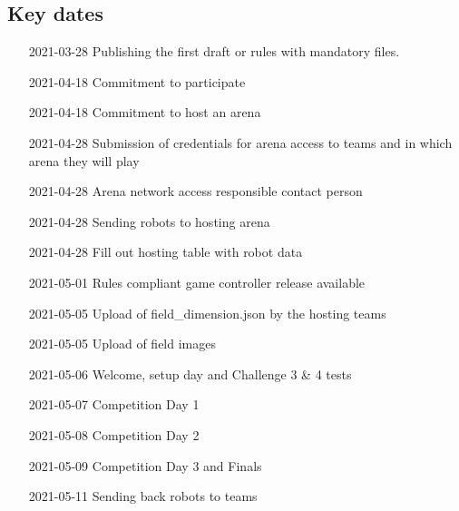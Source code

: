\subsection{Key dates}

\begin{itemize}[leftmargin=*,labelsep=0.7cm, labelindent=2cm]
    \item [2021-03-28] Publishing the first draft or rules with mandatory files.
    \item [2021-04-18] Commitment to participate
    \item [2021-04-18] Commitment to host an arena
    \item [2021-04-28] Submission of credentials for arena access to teams and in which arena they will play
    \item [2021-04-28] Arena network access responsible contact person
    \item [2021-04-28] Sending robots to hosting arena
    \item [2021-04-28] Fill out hosting table with robot data
    \item [2021-05-01] Rules compliant game controller release available
    \item [2021-05-05] Upload of field\_dimension.json by the hosting teams
    \item [2021-05-05] Upload of field images
    \item [2021-05-06] Welcome, setup day and Challenge 3 \& 4 tests
    \item [2021-05-07] Competition Day 1
    \item [2021-05-08] Competition Day 2
    \item [2021-05-09] Competition Day 3 and Finals
    \item [2021-05-11] Sending back robots to teams
\end{itemize}
